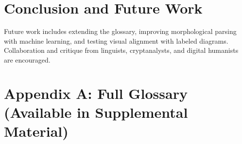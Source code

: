 \documentclass[12pt]{article}
\begin{document}
\section{Conclusion and Future Work}
Future work includes extending the glossary, improving morphological parsing with machine learning, and testing visual alignment with labeled diagrams. Collaboration and critique from linguists, cryptanalysts, and digital humanists are encouraged.

\section*{Appendix A: Full Glossary (Available in Supplemental Material)}
\end{document}
